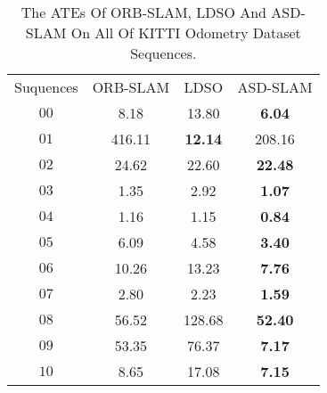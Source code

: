 \documentclass[letterpaper, 10 pt, conference]{ieeeconf}  %
\begin{document}
\begin{table}[h]

\caption{The ATEs Of ORB-SLAM, LDSO And ASD-SLAM On All Of KITTI Odometry Dataset Sequences.}
\begin{center}
\begin{tabular}{cccc}
\toprule
\hline
\multirow{1}{*}{Suquences} & \multicolumn{1}{c}{ORB-SLAM} & \multicolumn{1}{c}{LDSO} & \multicolumn{1}{c}{ASD-SLAM} \\
$00 $             &8.18                      & 13.80                    & \textbf{6.04}                   \\
$01 $             &416.11                          &\textbf{12.14}                   & 208.16                   \\
$02 $             &24.62                          & 22.60                    & \textbf{22.48}                   \\
$03 $             &1.35                         & 2.92                    & \textbf{1.07}                   \\
$04 $             &1.16                          &1.15                    & \textbf{0.84}                   \\
$05 $             &6.09                          & 4.58                 & \textbf{3.40}                   \\
$06 $             &10.26                          & 13.23                    & \textbf{7.76}                   \\
$07 $             &2.80                          & 2.23                   & \textbf{1.59}                 \\
$08 $             &56.52                         &128.68                   &\textbf{52.40}                   \\
$09 $             &53.35                        & 76.37                   &\textbf{7.17}                  \\
$10 $             &8.65                         &17.08                    & \textbf{7.15}                 \\
\hline
\hline
\toprule
\end{tabular} 
\end{center}
\end{table}
\end{document}

